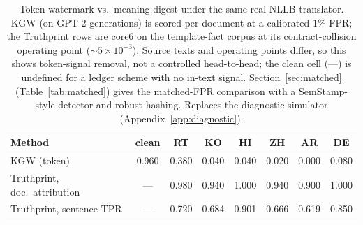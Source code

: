\documentclass[journal]{IEEEtran}
\begin{document}
\begin{table}[t]
\centering
\caption{Token watermark vs.\ meaning digest under the same real NLLB
translator. KGW (on GPT-2 generations) is scored per document at a calibrated
$1\%$ FPR; the Truthprint rows are core6 on the template-fact corpus at its
contract-collision operating point ($\sim\!5\times10^{-3}$). Source texts and
operating points differ, so this shows token-signal removal, not a controlled
head-to-head; the clean cell (---) is undefined for a ledger scheme with no
in-text signal. Section~\ref{sec:matched} (Table~\ref{tab:matched}) gives the
matched-FPR comparison with a SemStamp-style detector and robust hashing. Replaces the diagnostic simulator (Appendix~\ref{app:diagnostic}).}
\label{tab:baselines}
\footnotesize
\begin{tabular}{lccccccc}
\toprule
Method & clean & RT & KO & HI & ZH & AR & DE \\
\midrule
KGW (token) & 0.960 & 0.380 & 0.040 & 0.040 & 0.020 & 0.000 & 0.080 \\
Truthprint, doc.\ attribution & --- & 0.980 & 0.940 & 1.000 & 0.940 & 0.900 & 1.000 \\
Truthprint, sentence TPR & --- & 0.720 & 0.684 & 0.901 & 0.666 & 0.619 & 0.850 \\
\bottomrule
\end{tabular}
\end{table}
\end{document}

